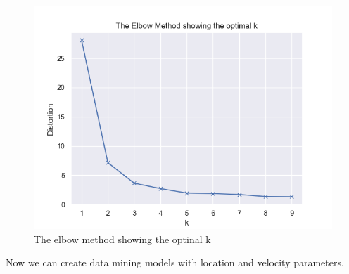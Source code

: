 \begin{figure}[H]
    \centering
    \includegraphics[width=0.8\linewidth]{Chapters/img/elbow_method_server.png}
    \caption{The elbow method showing the optinal k}
    \label{fig:elbow_method_server}
\end{figure}
Now we can create data mining models with location and velocity parameters.



